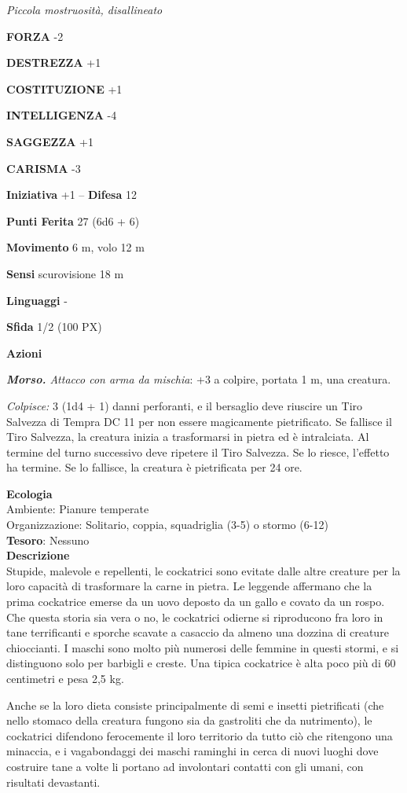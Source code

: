 \begin{multicols}{2}
	\textit{Piccola mostruosità, disallineato}

	\textbf{FORZA} -2

	\textbf{DESTREZZA} +1

	\textbf{COSTITUZIONE} +1

	\textbf{INTELLIGENZA} -4

	\textbf{SAGGEZZA} +1

	\textbf{CARISMA} -3

	\textbf{Iniziativa} +1 -- \textbf{Difesa} 12

	\textbf{Punti Ferita} 27 (6d6 + 6)

	\textbf{Movimento} 6 m, volo 12 m

	\textbf{Sensi} scurovisione 18 m

	\textbf{Linguaggi} -

	\textbf{Sfida} 1/2 (100 PX)

	\textbf{Azioni}

	\textit{\textbf{Morso.} Attacco con arma da mischia}: +3 a colpire, portata 1 m, una creatura.

	\textit{Colpisce:} 3 (1d4 + 1) danni perforanti, e il bersaglio deve riuscire un Tiro Salvezza di Tempra DC 11 per non essere magicamente pietrificato. Se fallisce il Tiro Salvezza, la creatura inizia a trasformarsi in pietra ed è intralciata. Al termine del turno successivo deve ripetere il Tiro Salvezza. Se lo riesce, l'effetto ha termine. Se lo fallisce, la creatura è pietrificata per 24 ore.

	\textbf{Ecologia}\\
	Ambiente: Pianure temperate\\
	Organizzazione: Solitario, coppia, squadriglia (3-5) o stormo (6-12)\\
	\textbf{Tesoro}: Nessuno\\
	\textbf{Descrizione}\\
	Stupide, malevole e repellenti, le cockatrici sono evitate dalle altre creature per la loro capacità di trasformare la carne in pietra. Le leggende affermano che la prima cockatrice emerse da un uovo deposto da un gallo e covato da un rospo. Che questa storia sia vera o no, le cockatrici odierne si riproducono fra loro in tane terrificanti e sporche scavate a casaccio da almeno una dozzina di creature chioccianti. I maschi sono molto più numerosi delle femmine in questi stormi, e si distinguono solo per barbigli e creste. Una tipica cockatrice è alta poco più di 60 centimetri e pesa 2,5 kg.

	Anche se la loro dieta consiste principalmente di semi e insetti pietrificati (che nello stomaco della creatura fungono sia da gastroliti che da nutrimento), le cockatrici difendono ferocemente il loro territorio da tutto ciò che ritengono una minaccia, e i vagabondaggi dei maschi raminghi in cerca di nuovi luoghi dove costruire tane a volte li portano ad involontari contatti con gli umani, con risultati devastanti.


\end{multicols}
